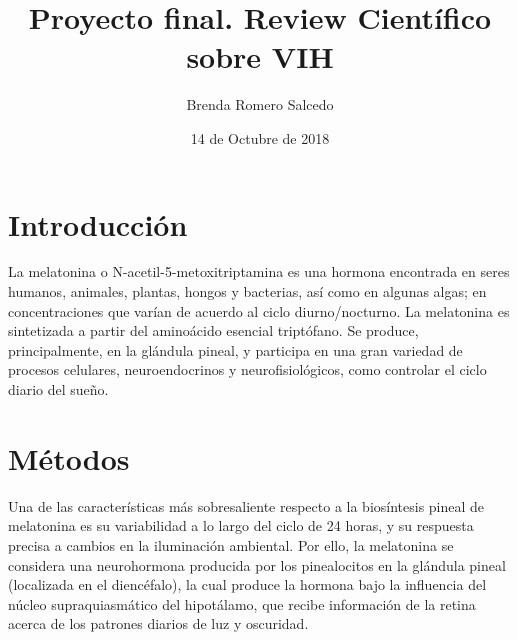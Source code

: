 \documentclass[a4paper,twocolumn,10pt]{article}
\author{Brenda Romero Salcedo}
\title{Proyecto final. Review Científico sobre VIH}
\date{14 de Octubre de 2018}
\begin{document}
\section{Introducción}
La melatonina o N-acetil-5-metoxitriptamina es una hormona encontrada en seres humanos, animales, plantas, hongos y bacterias, así como en algunas algas; en concentraciones que varían de acuerdo al ciclo diurno/nocturno. La melatonina es sintetizada a partir del aminoácido esencial triptófano. Se produce, principalmente, en la glándula pineal, y participa en una gran variedad de procesos celulares, neuroendocrinos y neurofisiológicos, como controlar el ciclo diario del sueño.
\section{Métodos}
Una de las características más sobresaliente respecto a la biosíntesis pineal de melatonina es su variabilidad a lo largo del ciclo de 24 horas, y su respuesta precisa a cambios en la iluminación ambiental. Por ello, la melatonina se considera una neurohormona producida por los pinealocitos en la glándula pineal (localizada en el diencéfalo), la cual produce la hormona bajo la influencia del núcleo supraquiasmático del hipotálamo, que recibe información de la retina acerca de los patrones diarios de luz y oscuridad.
\end{document}
